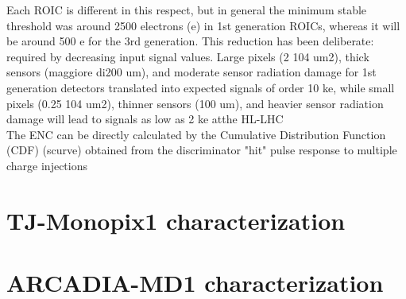 Each ROIC is different in this respect, but in general the minimum stable threshold was around 2500 electrons (e) in 1st generation ROICs, whereas it will be around 500 e for the 3rd generation. This reduction has been deliberate: required by decreasing input signal values. Large pixels (2  104 um2), thick sensors (maggiore di200 um), and moderate sensor radiation damage for 1st generation detectors translated into expected signals of order 10 ke, while small pixels (0.25  104 um2), thinner sensors (100 um), and heavier sensor radiation damage will lead to signals as low as 2 ke atthe HL-LHC\\
The ENC can be directly calculated by the Cumulative Distribution Function (CDF) (scurve) obtained from the discriminator "hit" pulse response to multiple charge injections


\section{TJ-Monopix1 characterization}


\section{ARCADIA-MD1 characterization}
